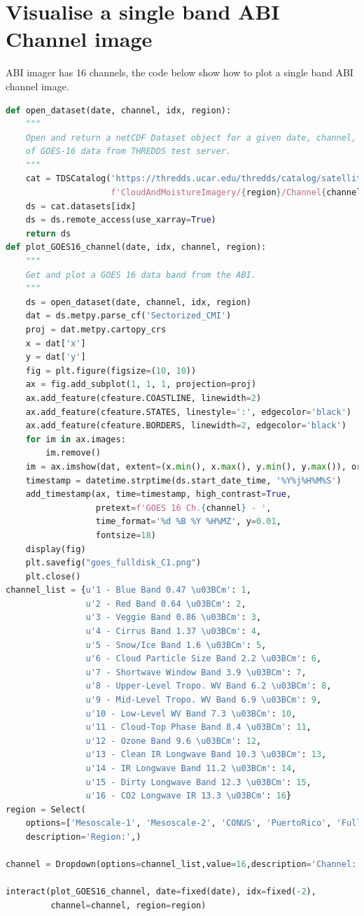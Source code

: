 \section{Visualise a single band ABI Channel image}
ABI imager has 16 channels, the code below show how to plot a single band ABI channel image.
\begin{lstlisting}[language=Python]
def open_dataset(date, channel, idx, region):
    """
    Open and return a netCDF Dataset object for a given date, channel, and image index
    of GOES-16 data from THREDDS test server.
    """
    cat = TDSCatalog('https://thredds.ucar.edu/thredds/catalog/satellite/goes/east/products/'
                     f'CloudAndMoistureImagery/{region}/Channel{channel:02d}/{date:%Y%m%d}/catalog.xml')
    ds = cat.datasets[idx]
    ds = ds.remote_access(use_xarray=True)   
    return ds
def plot_GOES16_channel(date, idx, channel, region):
    """
    Get and plot a GOES 16 data band from the ABI.
    """
    ds = open_dataset(date, channel, idx, region)
    dat = ds.metpy.parse_cf('Sectorized_CMI')
    proj = dat.metpy.cartopy_crs
    x = dat['x']
    y = dat['y']
    fig = plt.figure(figsize=(10, 10))
    ax = fig.add_subplot(1, 1, 1, projection=proj)
    ax.add_feature(cfeature.COASTLINE, linewidth=2)
    ax.add_feature(cfeature.STATES, linestyle=':', edgecolor='black')
    ax.add_feature(cfeature.BORDERS, linewidth=2, edgecolor='black')
    for im in ax.images:
        im.remove()
    im = ax.imshow(dat, extent=(x.min(), x.max(), y.min(), y.max()), origin='upper')
    timestamp = datetime.strptime(ds.start_date_time, '%Y%j%H%M%S')
    add_timestamp(ax, time=timestamp, high_contrast=True, 
                  pretext=f'GOES 16 Ch.{channel} - ',
                  time_format='%d %B %Y %H%MZ', y=0.01,
                  fontsize=18)
    display(fig)
    plt.savefig("goes_fulldisk_C1.png")
    plt.close()
channel_list = {u'1 - Blue Band 0.47 \u03BCm': 1,
                u'2 - Red Band 0.64 \u03BCm': 2,
                u'3 - Veggie Band 0.86 \u03BCm': 3,
                u'4 - Cirrus Band 1.37 \u03BCm': 4,
                u'5 - Snow/Ice Band 1.6 \u03BCm': 5,
                u'6 - Cloud Particle Size Band 2.2 \u03BCm': 6,
                u'7 - Shortwave Window Band 3.9 \u03BCm': 7,
                u'8 - Upper-Level Tropo. WV Band 6.2 \u03BCm': 8,
                u'9 - Mid-Level Tropo. WV Band 6.9 \u03BCm': 9,
                u'10 - Low-Level WV Band 7.3 \u03BCm': 10,
                u'11 - Cloud-Top Phase Band 8.4 \u03BCm': 11,
                u'12 - Ozone Band 9.6 \u03BCm': 12,
                u'13 - Clean IR Longwave Band 10.3 \u03BCm': 13,
                u'14 - IR Longwave Band 11.2 \u03BCm': 14,
                u'15 - Dirty Longwave Band 12.3 \u03BCm': 15,
                u'16 - CO2 Longwave IR 13.3 \u03BCm': 16}
region = Select(
    options=['Mesoscale-1', 'Mesoscale-2', 'CONUS', 'PuertoRico', 'FullDisk'],
    description='Region:',)

channel = Dropdown(options=channel_list,value=16,description='Channel:',)

interact(plot_GOES16_channel, date=fixed(date), idx=fixed(-2), 
         channel=channel, region=region)

\end{lstlisting}

